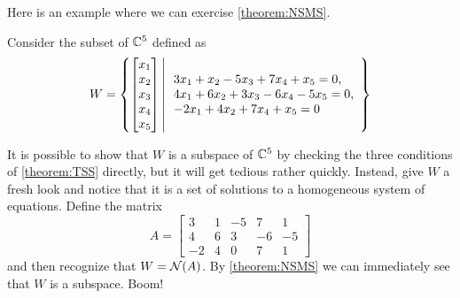 \documentclass{ximera}
\begin{document}
Here is an example where we can exercise \ref{theorem:NSMS}.

\begin{example}

  Consider the subset of $\mathbb{C}^{5}$ defined as
  \[
    W =\left\lbrace\begin{bmatrix}x_1\\x_2\\x_3\\x_4\\x_5\end{bmatrix}\,\middle|\,
      \begin{array}{l}
        3x_1+x_2-5x_3+7x_4+x_5=0,\\
        4x_1+6x_2+3x_3-6x_4-5x_5=0,\\
        -2x_1+4x_2+7x_4+x_5=0
      \end{array}
    \right\rbrace
  \]

  It is possible to show that $W$ is a subspace of $\mathbb{C}^{5}$ by
  checking the three conditions of \ref{theorem:TSS} directly, but it
  will get tedious rather quickly.  Instead, give $W$ a fresh look and
  notice that it is a set of solutions to a homogeneous system of
  equations.  Define the matrix
  \[
    A=\begin{bmatrix}
      3&1&-5&7&1\\
      4&6&3&-6&-5\\
      -2&4&0&7&1
    \end{bmatrix}
  \]
  and then recognize that $W=\mathcal{N}\!\left(A\right)$.  By \ref{theorem:NSMS} we can
  immediately see that $W$ is a subspace.  Boom!

\end{example}
\end{document}
